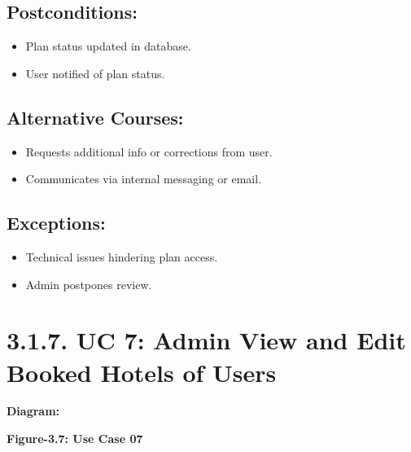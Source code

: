 \documentclass{scrreprt}
\begin{document}
\subsection*{\textbf{Postconditions:}}

\begin{itemize}
    \item Plan status updated in database.
    \item User notified of plan status.
\end{itemize}

\subsection*{\textbf{Alternative Courses:}}

\begin{itemize}
    \item Requests additional info or corrections from user.
    \item Communicates via internal messaging or email.
\end{itemize}

\subsection*{\textbf{Exceptions:}}

\begin{itemize}
    \item Technical issues hindering plan access.
    \item Admin postpones review.
\end{itemize}

\section*{\textbf{3.1.7. UC 7: Admin View and Edit Booked Hotels of Users}}
\textbf{Diagram:}
\newline
\newline

\begin{center}
    \parbox{0.8\textwidth}{ 
        \centering
    }
\end{center}
\begin{center}
    \parbox{0.8\textwidth}{ 
        \centering
        \textbf{Figure-3.7: Use Case 07}
    }
\end{center}
\end{document}
